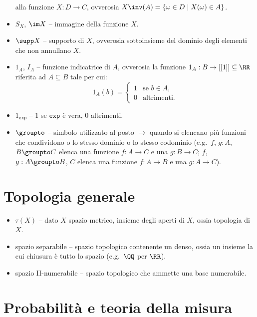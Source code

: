 \begin{multicols*}{2}
\begin{itemize}
        alla funzione $X : D \to C$, ovverosia $X\inv(A) = \{\omega \in D \mid X(\omega) \in A\}$.
        \item $S_X$, $\im X$ -- immagine della funzione $X$.
        \item $\supp X$ -- supporto di $X$, ovverosia sottoinsieme del
        dominio degli elementi che non annullano $X$.
        \item $1_A$, $I_A$ -- funzione indicatrice di $A$, ovverosia la
        funzione $1_A : B \to [[1]] \subseteq \RR$ riferita ad $A \subseteq B$
        tale per cui:
        \[
            1_A(b) = \begin{cases}
                1 & \text{se } b \in A, \\
                0 & \text{altrimenti}.
            \end{cases}
        \]
        \item $1_{\texttt{exp}}$ -- $1$ se $\texttt{exp}$ è vera, $0$ altrimenti.
        \item $\groupto$ -- simbolo utilizzato al posto $\to$ quando si elencano
        più funzioni che condividono o lo stesso dominio o lo stesso codominio (e.g.~$f$, $g : A$, $B \groupto C$ elenca una funzione $f : A \to C$ e una $g : B \to C$; $f$, $g : A \groupto B$, $C$ elenca una funzione
        $f : A \to B$ e una $g : A \to C$).
    \end{itemize}

    \section*{Topologia generale}

    \begin{itemize}
        \item $\tau(X)$ -- dato $X$ spazio metrico, insieme degli aperti di $X$, ossia topologia di $X$.
        \item spazio separabile -- spazio topologico contenente un denso, ossia un insieme la cui chiusura è tutto lo spazio (e.g.~$\QQ$ per $\RR$).
        \item spazio II-numerabile -- spazio topologico che ammette una base numerabile.
    \end{itemize}

    \section*{Probabilità e teoria della misura}


\end{multicols*}
